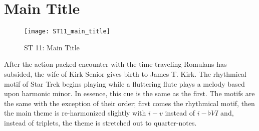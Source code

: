 \section{Main Title}
\begin{figure}[h!]
\center
\texttt{[image: ST11\_main\_title]}
	\caption{ST 11: Main Title}
	\label{ST_11_main_title}
\end{figure}
After the action packed encounter with the time traveling Romulans has subsided, the wife of Kirk Senior gives birth to James T. Kirk. The  rhythmical motif of Star Trek begins playing while a fluttering flute plays a melody based upon harmonic minor. In essence, this cue is the same as the first. The motifs are the same with the exception of their order; first comes the rhythmical motif, then the main theme is re-harmonized slightly with \(i-v\) instead of \(i-\flat{VI}\) and, instead of triplets, the theme is stretched out to quarter-notes. 

\clearpage


